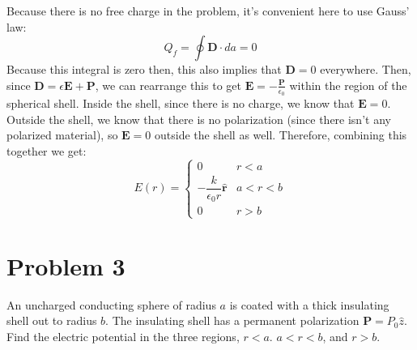 \documentclass[10pt]{article}
\begin{document}
	\begin{solution}
		Because there is no free charge in the problem, it's convenient here to use Gauss' law: 
		\[
		Q_f = \oint \mathbf D \cdot da = 0
		\] 
		Because this integral is zero then, this also implies that $\mathbf D = 0$ everywhere. 
		Then, since $\mathbf D = \epsilon \mathbf E + \mathbf P$, we can rearrange this to get $\mathbf E =
		-\frac{\mathbf P}{\epsilon_0}$ within the 
		region of the spherical shell. Inside the shell, since there is no charge, we know that $\mathbf E = 0$. 
		Outside
		the shell, we know that there is no polarization (since there isn't any polarized material), so 
		$\mathbf E = 0$
		outside the shell as well. Therefore, combining this together we get: 
		\[
		E(r) = \begin{cases}
			0 & r < a\\
			-\dfrac{k}{\epsilon_0 r} \hat{\mathbf r}&  a < r < b \\
			0 & r > b 
		\end{cases}
		\] 
	\end{solution}

	\pagebreak	

	\section*{Problem 3}
	An uncharged conducting sphere of radius $a$ is coated with a thick insulating shell out to radius $b$. The 
	insulating shell has a permanent polarization $\mathbf P = P_0 \hat{z}$. Find the electric potential in the 
	three regions, $r < a$. $a < r < b$, and $r > b$. 
\end{document}
